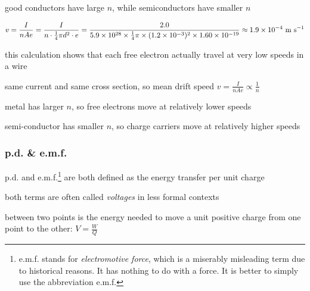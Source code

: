 good conductors have large $n$, while semiconductors have smaller $n$



\solc\begin{equation*}
v = \frac{I}{nAe} = \frac{I}{n\cdot\frac{1}{4} \pi d^2 \cdot e} = \frac{2.0}{5.9\times10^{28} \times \frac{1}{4}\pi \times (1.2\times10^{-3})^2\times1.60\times10^{-19}} \approx 1.9\times10^{-4} \text{ m s$^{-1}$}
\end{equation*}

\eqyskip this calculation shows that each free electron actually travel at very low speeds in a wire \eoe


\sol same current and same cross section, so mean drift speed $ v = \frac{I}{nAe} \propto \frac{1}{n}$

metal has larger $n$, so free electrons move at relatively lower speeds

semi-conductor has smaller $n$, so charge carriers move at relatively higher speeds \eoe




\subsubsection{p.d. \& e.m.f.}\label{ch:potential-difference}

p.d. and e.m.f.\footnote{e.m.f. stands for \emph{electromotive force}, which is a miserably misleading term due to historical reasons. It has nothing to do with a force. It is better to simply use the abbreviation e.m.f.} are both defined as the energy transfer per unit charge

both terms are often called \emph{voltages} in less formal contexts

\begin{ilight}
	 between two points is the energy needed to move a unit positive charge from one point to the other: $\boxed{V=\frac{W}{Q}} $ 
\end{ilight}

